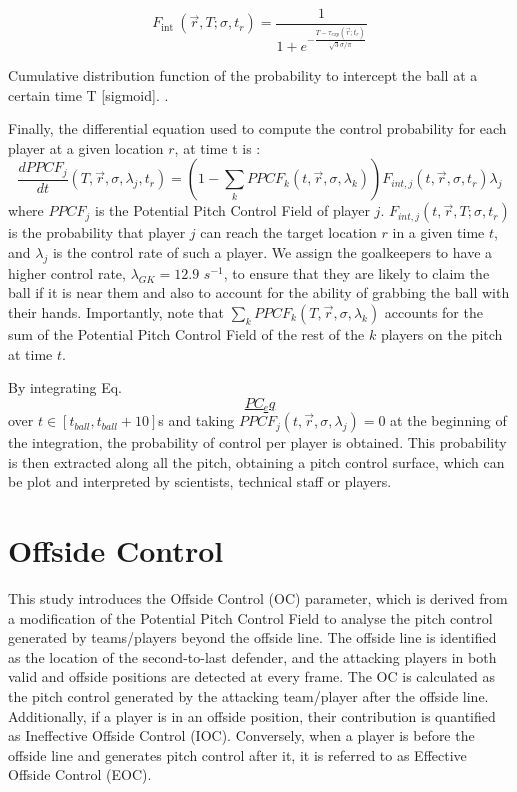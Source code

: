 \documentclass[twoside,nohyper]{tufte-book}
\begin{document}
\[F_{\text {int }}(\vec{r},T;\sigma, t_r)=\frac{1}{1+e^{-\frac{T- \tau_{exp}(\vec{r} ; t_r)}{\sqrt{3} \sigma / \pi}}}
    \label{sigmoid}\]

Cumulative distribution function of the probability to
intercept the ball at a certain time T {[}sigmoid{]}. {}.

Finally, the differential equation used to compute the control
probability for each player at a given location \(r\), at time t is
\citep{Spearman}:
\[\frac{d P P C F_j}{d t}\left(T, \vec{r} , \sigma, \lambda_j, t_r\right)=\left(1-\sum_k P P C F_k\left(t, \vec{r} , \sigma, \lambda_k\right)\right) F_{int,j}(t, \vec{r}  , \sigma, t_r) \lambda_j
\label{PC_eq}\] where \(PPCF_j\) is the Potential Pitch Control Field of
player \(j\). \(F_{int,j}(t, \vec{r}, T ; \sigma, t_r)\) is the probability
that player \(j\) can reach the target location \(r\) in a given time \(t\),
and \(\lambda_j\) is the control rate of such a player. We assign the
goalkeepers to have a higher control rate, \(\lambda_{GK} = 12.9\)
\(s^{-1}\), to ensure that they are likely to claim the ball if it is near
them and also to account for the ability of grabbing the ball with their
hands. Importantly, note that
\(\sum_k P P C F_k\left(T, \vec{r} , \sigma, \lambda_k\right)\) accounts
for the sum of the Potential Pitch Control Field of the rest of the \(k\)
players on the pitch at time \(t\).

By integrating Eq. \protect\hyperlink{PC_eq}{\[PC_eq\]} over \(t \in \left[ t_{ball},t_{ball} + 10 \right]\)s
and taking \(P P C F_j\left(t, \vec{r} , \sigma, \lambda_j\right) = 0\) at
the beginning of the integration, the probability of control per player
is obtained. This probability is then extracted along all the pitch,
obtaining a pitch control surface, which can be plot and interpreted by
scientists, technical staff or players.

\hypertarget{offside-control}{%
\chapter{Offside Control}\label{offside-control}}

This study introduces the Offside Control (OC) parameter, which is
derived from a modification of the Potential Pitch Control Field to
analyse the pitch control generated by teams/players beyond the offside
line. The offside line is identified as the location of the
second-to-last defender, and the attacking players in both valid and
offside positions are detected at every frame. The OC is calculated as
the pitch control generated by the attacking team/player after the
offside line. Additionally, if a player is in an offside position, their
contribution is quantified as Ineffective Offside Control (IOC).
Conversely, when a player is before the offside line and generates pitch
control after it, it is referred to as Effective Offside Control (EOC).
\end{document}
